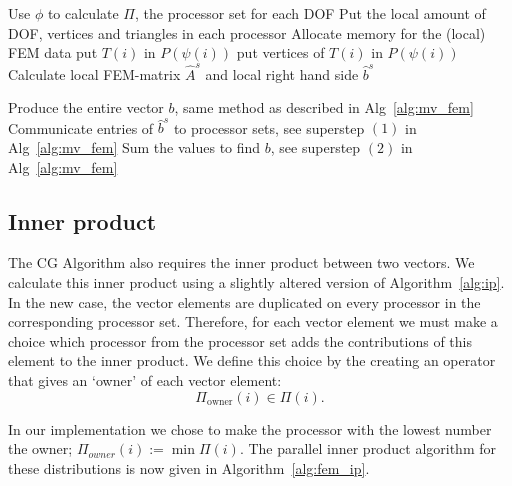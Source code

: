 \documentclass[11pt]{amsart}
\theoremstyle{definition}
\begin{document}
\begin{algorithm}[H]
	 {
		Use $\phi$ to calculate $\Pi$, the processor set for each DOF\; 
		Put the local amount of DOF, vertices and triangles in each processor\;
	}
	Allocate memory for the (local) FEM data\;
	 {
		 {
			put $T(i)$ in $P(\psi(i))$\;
			put vertices of $T(i)$ in $P(\psi(i))$ 
		}
	}
	Calculate local FEM-matrix $\hat A^s$ and local right hand side $\hat b^s$\;
	
  { Produce the entire vector $b$, same method as described in Alg~\ref{alg:mv_fem} }
	Communicate entries of $\hat b^s$ to processor sets, see superstep $(1)$ in Alg~\ref{alg:mv_fem}\;
	Sum the values to find $b$, see superstep $(2)$ in Alg~\ref{alg:mv_fem}\;
 \caption{Algorithm that calculates the local FEM data.}
 \label{alg:init_fem}
\end{algorithm}

\subsection{Inner product}
The CG Algorithm also requires the inner product between two vectors. We calculate this inner product using a slightly altered version of Algorithm~\ref{alg:ip}. In the new case, the vector elements are duplicated on every processor in the corresponding processor set. Therefore, for each vector element we must make a choice which processor from the processor set adds the contributions of this element to the inner product. We define this choice by the creating an operator that gives an `owner' of each vector element:
\[
	\Pi_{\text{owner}}(i) \in \Pi(i).
\]

In our implementation we chose to make the processor with the lowest number the owner; $\Pi_{owner}(i) := \min \Pi(i)$. The parallel inner product algorithm for these distributions is now given in Algorithm~\ref{alg:fem_ip}.
\end{document}

